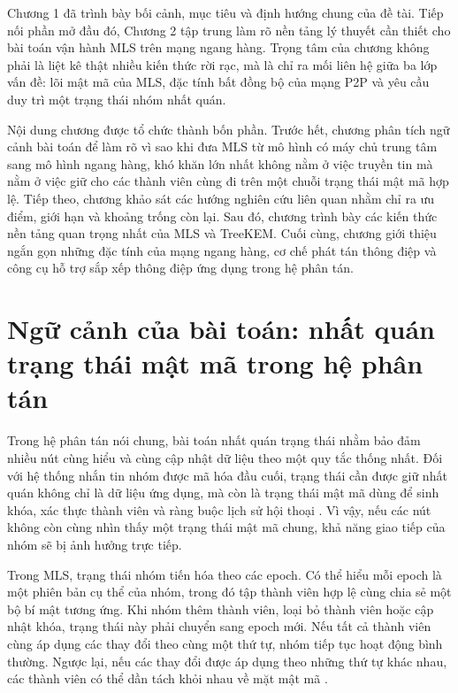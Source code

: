 \documentclass[../DoAn.tex]{subfiles}
\begin{document}
Chương 1 đã trình bày bối cảnh, mục tiêu và định hướng chung của đề tài. Tiếp nối phần mở đầu đó, Chương 2 tập trung làm rõ nền tảng lý thuyết cần thiết cho bài toán vận hành MLS trên mạng ngang hàng. Trọng tâm của chương không phải là liệt kê thật nhiều kiến thức rời rạc, mà là chỉ ra mối liên hệ giữa ba lớp vấn đề: lõi mật mã của MLS, đặc tính bất đồng bộ của mạng P2P và yêu cầu duy trì một trạng thái nhóm nhất quán.

Nội dung chương được tổ chức thành bốn phần. Trước hết, chương phân tích ngữ cảnh bài toán để làm rõ vì sao khi đưa MLS từ mô hình có máy chủ trung tâm sang mô hình ngang hàng, khó khăn lớn nhất không nằm ở việc truyền tin mà nằm ở việc giữ cho các thành viên cùng đi trên một chuỗi trạng thái mật mã hợp lệ. Tiếp theo, chương khảo sát các hướng nghiên cứu liên quan nhằm chỉ ra ưu điểm, giới hạn và khoảng trống còn lại. Sau đó, chương trình bày các kiến thức nền tảng quan trọng nhất của MLS và TreeKEM. Cuối cùng, chương giới thiệu ngắn gọn những đặc tính của mạng ngang hàng, cơ chế phát tán thông điệp và công cụ hỗ trợ sắp xếp thông điệp ứng dụng trong hệ phân tán.

\section{Ngữ cảnh của bài toán: nhất quán trạng thái mật mã trong hệ phân tán}
\label{sec:ngu-canh-bai-toan}

Trong hệ phân tán nói chung, bài toán nhất quán trạng thái nhằm bảo đảm nhiều nút cùng hiểu và cùng cập nhật dữ liệu theo một quy tắc thống nhất. Đối với hệ thống nhắn tin nhóm được mã hóa đầu cuối, trạng thái cần được giữ nhất quán không chỉ là dữ liệu ứng dụng, mà còn là trạng thái mật mã dùng để sinh khóa, xác thực thành viên và ràng buộc lịch sử hội thoại \cite{rfc9420,rfc9750}. Vì vậy, nếu các nút không còn cùng nhìn thấy một trạng thái mật mã chung, khả năng giao tiếp của nhóm sẽ bị ảnh hưởng trực tiếp.

Trong MLS, trạng thái nhóm tiến hóa theo các epoch. Có thể hiểu mỗi epoch là một phiên bản cụ thể của nhóm, trong đó tập thành viên hợp lệ cùng chia sẻ một bộ bí mật tương ứng. Khi nhóm thêm thành viên, loại bỏ thành viên hoặc cập nhật khóa, trạng thái này phải chuyển sang epoch mới. Nếu tất cả thành viên cùng áp dụng các thay đổi theo cùng một thứ tự, nhóm tiếp tục hoạt động bình thường. Ngược lại, nếu các thay đổi được áp dụng theo những thứ tự khác nhau, các thành viên có thể dần tách khỏi nhau về mặt mật mã \cite{rfc9420,alwen2023fork}.
\end{document}
